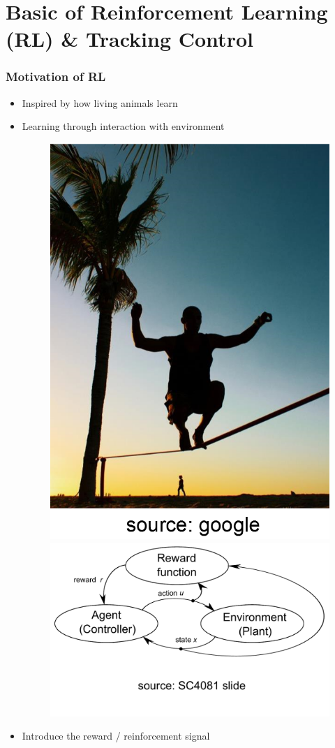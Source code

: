 \documentclass{beamer}
\begin{document}
	\section{Basic of Reinforcement Learning (RL) \& Tracking Control}
	\begin{frame}\frametitle{Motivation of RL}
		\begin{itemize}
			\item Inspired by how living animals learn
			\pause
			\item Learning through interaction with environment
			\pause
			\begin{figure}
				\includegraphics[width=0.30\linewidth]{images/slacklining} \hspace{5mm}
				\includegraphics[width=0.60\linewidth]{images/rl_diagram}
			\end{figure}
			\pause
			\item Introduce the reward / reinforcement signal
		\end{itemize}
	\end{frame}
	
\end{document}
